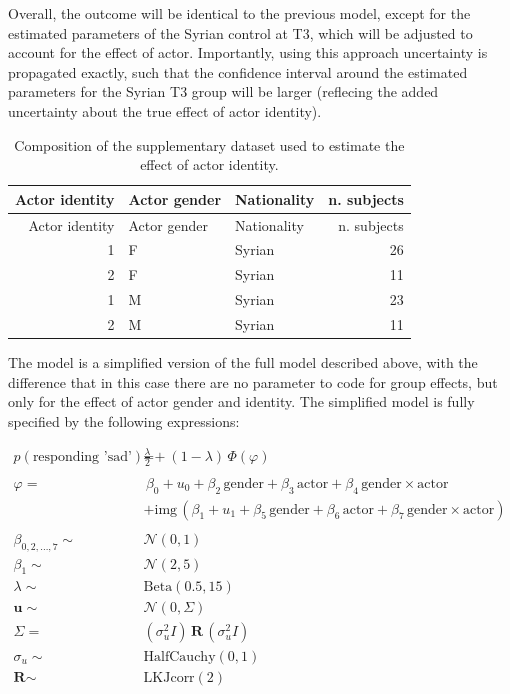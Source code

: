 \documentclass[]{article}
\begin{document}
Overall, the outcome will be identical to the previous model, except for
the estimated parameters of the Syrian control at T3, which will be
adjusted to account for the effect of actor. Importantly, using this
approach uncertainty is propagated exactly, such that the confidence
interval around the estimated parameters for the Syrian T3 group will be
larger (reflecing the added uncertainty about the true effect of actor
identity).

\begin{longtable}[]{@{}rllr@{}}
\caption{Composition of the supplementary dataset used to estimate the
effect of actor identity.}\tabularnewline
\toprule
Actor identity & Actor gender & Nationality & n. subjects\tabularnewline
\midrule
\endfirsthead
\toprule
Actor identity & Actor gender & Nationality & n. subjects\tabularnewline
\midrule
\endhead
1 & F & Syrian & 26\tabularnewline
2 & F & Syrian & 11\tabularnewline
1 & M & Syrian & 23\tabularnewline
2 & M & Syrian & 11\tabularnewline
\bottomrule
\end{longtable}

The model is a simplified version of the full model described above,
with the difference that in this case there are no parameter to code for
group effects, but only for the effect of actor gender and identity. The
simplified model is fully specified by the following expressions:

\begin{align*}
 p(\text{responding 'sad'}) = & \frac{\lambda}{2} + (1 - \lambda) \, \Phi \left(\varphi \right)  \\
 \, \\
\varphi =  & \,  \beta_0  + u_0 + \beta_2 \, \text{gender} +\beta_3\, \text{actor} + \beta_4 \, \text{gender} \times \text{actor} \\
 & +  \text{img} \, \left(\beta_1 +  u_1 + \beta_5 \, \text{gender} +\beta_6\, \text{actor} + \beta_7 \, \text{gender} \times \text{actor} \right) \\
\, \\
\beta_{0, 2, \dots, 7} \sim & \mathcal{N}\left(0, 1 \right) \\
\beta_1 \sim & \mathcal{N}\left(2, 5 \right) \\
\lambda \sim & \text{Beta} \left(0.5, 15 \right)\\
\mathbf{u} \sim & \mathcal{N}\left(0, \Sigma \right) \\
\Sigma  = & \left(\sigma_u^2 \textit{I} \right) \, \textbf{R} \, \left( \sigma_u^2 \textit{I} \right) \\
\sigma_u  \sim & \text{HalfCauchy} \left(0, 1\right)\\
\textbf{R} \sim & \text{LKJcorr} \left( 2 \right)
\end{align*}
\end{document}
